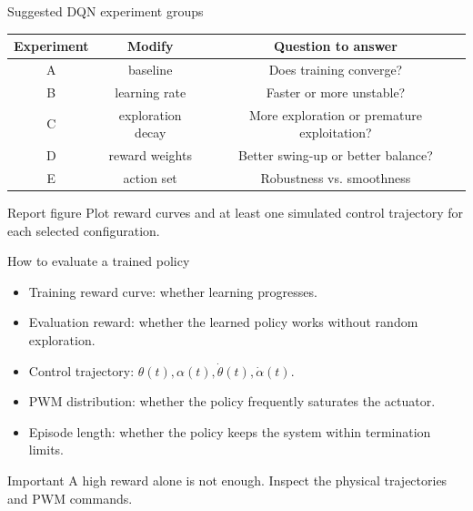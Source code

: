 \documentclass[aspectratio=169]{beamer}
\begin{document}
\begin{frame}{Suggested DQN experiment groups}
\begin{center}
\begin{tabular}{c|c|c}
\hline
Experiment & Modify & Question to answer \\
\hline
A & baseline & Does training converge? \\
B & learning rate & Faster or more unstable? \\
C & exploration decay & More exploration or premature exploitation? \\
D & reward weights & Better swing-up or better balance? \\
E & action set & Robustness vs. smoothness \\
\hline
\end{tabular}
\end{center}

\vspace{0.25cm}
\begin{block}{Report figure}
\small
Plot reward curves and at least one simulated control trajectory for each selected configuration.
\end{block}
\end{frame}

\begin{frame}{How to evaluate a trained policy}
\begin{itemize}
    \item Training reward curve: whether learning progresses.
    \vspace{0.18cm}
    \item Evaluation reward: whether the learned policy works without random exploration.
    \vspace{0.18cm}
    \item Control trajectory: \(\theta(t),\alpha(t),\dot\theta(t),\dot\alpha(t)\).
    \vspace{0.18cm}
    \item PWM distribution: whether the policy frequently saturates the actuator.
    \vspace{0.18cm}
    \item Episode length: whether the policy keeps the system within termination limits.
\end{itemize}

\vspace{0.2cm}
\begin{alertblock}{Important}
\small
A high reward alone is not enough. Inspect the physical trajectories and PWM commands.
\end{alertblock}
\end{frame}
\end{document}
